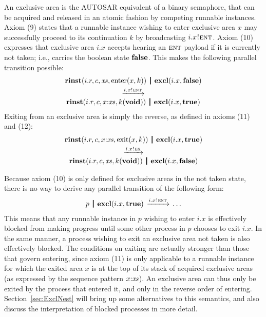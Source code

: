\documentclass[twocolumn]{article}
\begin{document}
An exclusive area is the AUTOSAR equivalent of a binary semaphore, that can be acquired and released in an atomic fashion by competing runnable instances. Axiom (9) states that a runnable instance wishing to enter exclusive area $x$ may successfully proceed to its continuation $k$ by broadcasting $i.x \mspace{1mu}!\mspace{1mu} \textsc{ent}$. Axiom (10) expresses that exclusive area $i.x$ accepts hearing an ${\textsc{ent}}$ payload if it is currently not taken; i.e., carries the boolean state $\textbf{false}$. This makes the following parallel transition possible:
$$
\begin{array}{c}
  \Trinst {i.r} c \Xs {\TrteEnter x k}
  \Opar
  \Texcl {i.x} \Tfalse \vspace{0.6ex} \\
  \red {\say {i.x} \Tent} \\
  \Trinst {i.r} c {\Tcons x \Xs} {\Tap k \Tvoid}
  \Opar
  \Texcl {i.x} \Ttrue
\end{array}
$$
Exiting from an exclusive area is simply the reverse, as defined in axioms (11) and (12):
$$
\begin{array}{c}
  \Trinst {i.r} c {\Tcons x \Xs} {\TrteExit x k}
  \Opar
  \Texcl {i.x} \Ttrue \vspace{0.6ex} \\
  \red {\say {i.x} \Tex} \\
  \Trinst {i.r} c \Xs {\Tap k \Tvoid}
  \Opar
  \Texcl {i.x} \Tfalse
\end{array}
$$

Because axiom (10) is only defined for exclusive areas in the not taken state, there is no way to derive any parallel transition of the following form:
$$
\begin{array}{c}
  p \Opar {\Texcl {i.x} \Ttrue} \red{\say{i.x}{\Tent}} \ldots \\
\end{array}
$$
This means that any runnable instance in $p$ wishing to enter $i.x$ is effectively blocked from making progress until some other process in $p$ chooses to exit $i.x$. In the same manner, a process wishing to exit an exclusive area not taken is also effectively blocked. The conditions on exiting are actually stronger than those that govern entering, since axiom (11) is only applicable to a runnable instance for which the exited area $x$ is at the top of its stack of acquired exclusive areas (as expressed by the sequence pattern $\Tcons x \Xs$). An exclusive area can thus only be exited by the process that entered it, and only in the reverse order of entering. Section~\ref{sec:ExclNest} will bring up some alternatives to this semantics, and also discuss the interpretation of blocked processes in more detail.
\end{document}
